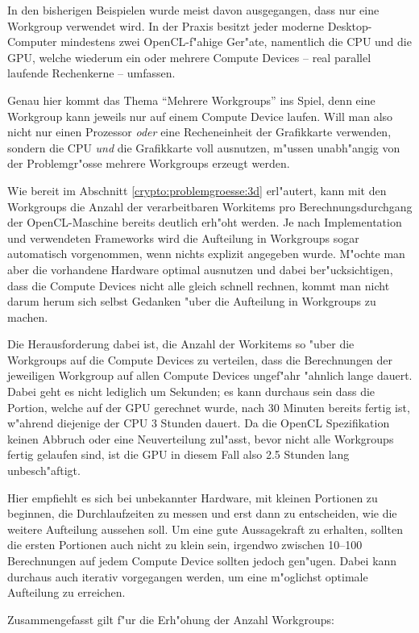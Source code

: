 \begin{refsection}
In den bisherigen Beispielen wurde meist davon ausgegangen, dass nur eine
Workgroup verwendet wird. In der Praxis besitzt jeder moderne Desktop-Computer
mindestens zwei OpenCL-f"ahige Ger"ate, namentlich die CPU und die GPU, welche
wiederum ein oder mehrere Compute Devices -- real parallel laufende Rechenkerne
-- umfassen.

Genau hier kommt das Thema ``Mehrere Workgroups'' ins Spiel, denn eine Workgroup
kann jeweils nur auf einem Compute Device laufen. Will man also nicht nur einen
Prozessor \textit{oder} eine Recheneinheit der Grafikkarte verwenden, sondern
die CPU \textit{und} die Grafikkarte voll ausnutzen, m"ussen unabh"angig von der
Problemgr"osse mehrere Workgroups erzeugt werden.

Wie bereit im Abschnitt \ref{crypto:problemgroesse:3d} erl"autert, kann mit den
Workgroups die Anzahl der verarbeitbaren Workitems pro Berechnungsdurchgang der
OpenCL-Maschine bereits deutlich erh"oht werden. Je nach Implementation und
verwendeten Frameworks wird die Aufteilung in Workgroups sogar automatisch
vorgenommen, wenn nichts explizit angegeben wurde. M"ochte man aber die
vorhandene Hardware optimal ausnutzen und dabei ber"ucksichtigen, dass die
Compute Devices nicht alle gleich schnell rechnen, kommt man nicht darum herum
sich selbst Gedanken "uber die Aufteilung in Workgroups zu machen.

Die Herausforderung dabei ist, die Anzahl der Workitems so "uber die Workgroups
auf die Compute Devices zu verteilen, dass die Berechnungen der jeweiligen
Workgroup auf allen Compute Devices ungef"ahr "ahnlich lange dauert.  Dabei geht
es nicht lediglich um Sekunden; es kann durchaus sein dass die Portion, welche
auf der GPU gerechnet wurde, nach 30 Minuten bereits fertig ist, w"ahrend
diejenige der CPU 3 Stunden dauert. Da die OpenCL Spezifikation keinen Abbruch
oder eine Neuverteilung zul"asst, bevor nicht alle Workgroups fertig gelaufen
sind, ist die GPU in diesem Fall also 2.5 Stunden lang unbesch"aftigt.

Hier empfiehlt es sich bei unbekannter Hardware, mit kleinen Portionen zu
beginnen, die Durchlaufzeiten zu messen und erst dann zu entscheiden, wie die
weitere Aufteilung aussehen soll. Um eine gute Aussagekraft zu erhalten, sollten
die ersten Portionen auch nicht zu klein sein, irgendwo zwischen 10--100
Berechnungen auf jedem Compute Device sollten jedoch gen"ugen. Dabei kann
durchaus auch iterativ vorgegangen werden, um eine m"oglichst optimale
Aufteilung zu erreichen.

Zusammengefasst gilt f"ur die Erh"ohung der Anzahl Workgroups:


\end{refsection}
